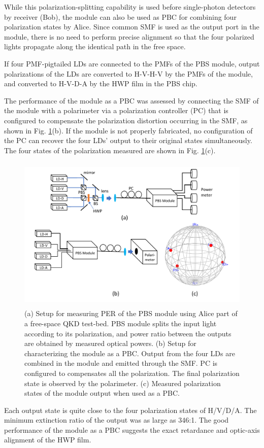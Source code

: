 \documentclass[letterpaper, 10pt]{article}
\begin{document}
While this polarization-splitting capability is used before single-photon detectors by receiver (Bob), the module can also be used as PBC for combining four polarization states by Alice.
Since common SMF is used as the output port in the module, there is no need to perform precise alignment so that the four polarized lights propagate along the identical path in the free space.

If four PMF-pigtailed LDs are connected to the PMFs of the PBS module, output polarizations of the LDs are converted to H-V-H-V  by the PMFs of the module, and converted to  H-V-D-A  by the HWP film in the PBS chip.

The performance of the module as a PBC was assessed by connecting the SMF of the module with a polarimeter via a polarization controller (PC) that is configured to compensate the polarization distortion occurring in the SMF, as shown in Fig. \ref{fig:meas_setup}(b).
If the module is not properly fabricated, no configuration of the PC can recover the four LDs' output to their original states simultaneously.
The four states of the polarization measured are shown in Fig. \ref{fig:meas_setup}(c).
\begin{figure}
  \centering
  \includegraphics[height=7.5cm]{meas_setup}
  \caption{(a) Setup for measuring PER of the PBS module using Alice part of a free-space QKD test-bed. PBS module splits the input light according to its polarization, and power ratio between the outputs are obtained by measured optical powers.  (b) Setup for characterizing the module as a PBC. Output from the four LDs are combined in the module and emitted through the SMF. PC is configured to compensates all the polarization. The final polarization state  is observed by the polarimeter. (c) Measured polarization states of the module output when used as a PBC.}
  \label{fig:meas_setup}
\end{figure}
Each output state is quite close to the four polarization states of H/V/D/A.
The minimum extinction ratio of the output was as large as 346:1.
The good performance of the module as a PBC suggests the exact retardance and optic-axis alignment of the HWP film.
\end{document}
